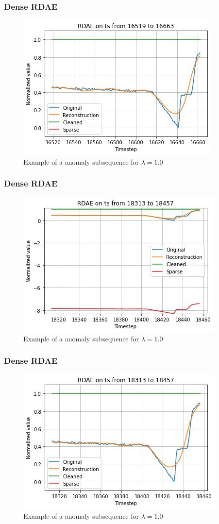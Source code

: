\documentclass{beamer}
\theoremstyle{plain}
\theoremstyle{definition}
\theoremstyle{remark}
\begin{document}
\begin{frame}
	\frametitle{Dense RDAE}
	\begin{figure}
		\centering
		\includegraphics[width=0.7\linewidth]{Images/lam1.0ts_anomalyzoom16519.jpg}
		\caption[]{Example of a anomaly subsequence for $\lambda=1.0$}
	\end{figure}
\end{frame}

\begin{frame}
	\frametitle{Dense RDAE}
	\begin{figure}
		\centering
		\includegraphics[width=0.7\linewidth]{Images/lam1.0ts_anomaly18313.jpg}
		\caption[]{Example of a anomaly subsequence for $\lambda=1.0$}
	\end{figure}
\end{frame}

\begin{frame}
	\frametitle{Dense RDAE}
	\begin{figure}
		\centering
		\includegraphics[width=0.7\linewidth]{Images/lam1.0ts_anomalyzoom18313.jpg}
		\caption[]{Example of a anomaly subsequence for $\lambda=1.0$}
	\end{figure}
\end{frame}
\end{document}
